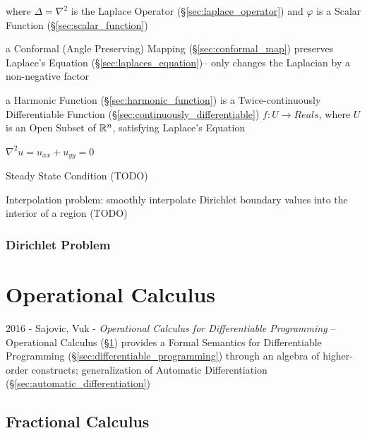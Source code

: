 {where $\Delta = \nabla^2$ is the Laplace Operator
(\S\ref{sec:laplace_operator}) and $\varphi$ is a Scalar Function
(\S\ref{sec:scalar_function})

a Conformal (Angle Preserving) Mapping (\S\ref{sec:conformal_map}) preserves
Laplace's Equation (\S\ref{sec:laplaces_equation})-- only changes the Laplacian
by a non-negative factor

a Harmonic Function (\S\ref{sec:harmonic_function}) is a Twice-continuously
Differentiable Function (\S\ref{sec:continuously_differentiable}) $f : U
\rightarrow Reals$, where $U$ is an Open Subset of $\mathbb{R}^n$, satisfying
Laplace's Equation

$\nabla^2 u = u_{xx} + u_{yy} = 0$ %

Steady State Condition (TODO)

Interpolation problem: smoothly interpolate Dirichlet boundary values into the
interior of a region (TODO)



\subsubsection{Dirichlet Problem}\label{sec:dirichlet_problem}



\section{Operational Calculus}\label{sec:operational_calculus}

2016 - Sajovic, Vuk - \emph{Operational Calculus for Differentiable Programming}
-- Operational Calculus (\S\ref{sec:operational_calculus}) provides a Formal
Semantics for Differentiable Programming
(\S\ref{sec:differentiable_programming}) through an algebra of higher-order
constructs; generalization of Automatic Differentiation
(\S\ref{sec:automatic_differentiation})



\subsection{Fractional Calculus}\label{sec:fractional_calculus}

}
